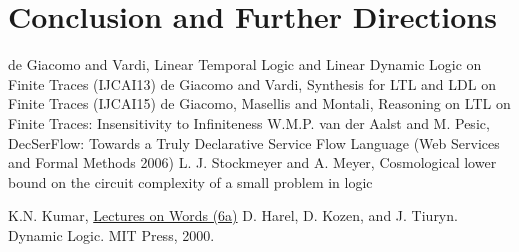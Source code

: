 \documentclass[11pt, oneside]{article}
\begin{document}




\section{Conclusion and Further Directions}

\begin{thebibliography}{9}
  de Giacomo and Vardi,
  Linear Temporal Logic and Linear Dynamic Logic on Finite Traces (IJCAI13)
  de Giacomo and Vardi, Synthesis for LTL and LDL on Finite Traces (IJCAI15)
  de Giacomo, Masellis and Montali, Reasoning on LTL on Finite Traces: Insensitivity to Infiniteness
    W.M.P. van der Aalst and M. Pesic, DecSerFlow: Towards a Truly Declarative Service Flow Language (Web Services and Formal Methods 2006)
    L. J. Stockmeyer and A. Meyer,
    Cosmological lower bound on the circuit complexity of a small problem in logic

  K.N. Kumar,
  \href{http://www.cmi.ac.in/~kumar/words/lecture06a.pdf}{Lectures on Words (6a)}
    D. Harel, D. Kozen, and J. Tiuryn. Dynamic Logic. MIT Press,
    2000.
\end{thebibliography}
\end{document}
